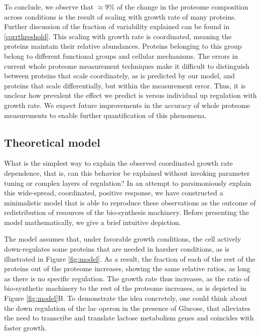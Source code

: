 \documentclass[notitlepage]{article}
\begin{document}
To conclude, we observe that $\approx 9\%$ of the change in the proteome composition across conditions is the result of scaling with growth rate of many proteins.
Further discussion of the fraction of variability explained can be found in \ref{corrthreshold}.
This scaling with growth rate is coordinated, meaning the proteins maintain their relative abundances.
Proteins belonging to this group belong to different functional groups and cellular mechanisms.
The errors in current whole proteome measurement techniques make it difficult to distinguish between proteins that scale coordinately, as is predicted by our model, and proteins that scale differentially, but within the measurement error.
Thus, it is unclear how prevalent the effect we predict is versus individual up regulation with growth rate.
We expect future improvements in the accuracy of whole proteome measurements to enable further quantification of this phenomena.

\subsection{Theoretical model}
What is the simplest way to explain the observed coordinated growth rate dependence, that is, can this behavior be explained without invoking parameter tuning or complex layers of regulation?
In an attempt to parsimoniously explain this wide-spread, coordinated, positive response, we have constructed a minimalistic model that is able to reproduce these observations as the outcome of redistribution of resources of the bio-synthesis machinery.
Before presenting the model mathematically, we give a brief intuitive depiction.

The model assumes that, under favorable growth conditions, the cell actively down-regulates some proteins that are needed in harsher conditions, as is illustrated in Figure \ref{fig:model}.
As a result, the fraction of each of the rest of the proteins out of the proteome increases, showing the same relative ratios, as long as there is no specific regulation.
The growth rate thus increases, as the ratio of bio-synthetic machinery to the rest of the proteome increases, as is depicted in Figure \ref{fig:model}B.
To demonstrate the idea concretely, one could think about the down regulation of the lac operon in the presence of Glucose, that alleviates the need to transcribe and translate lactose metabolism genes and coincides with faster growth.
\end{document}
